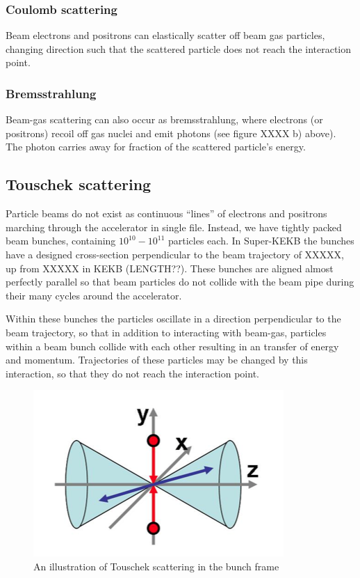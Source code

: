 \documentclass[12pt]{thesis}  %
\begin{document}
\subsubsection{Coulomb scattering}

Beam electrons and positrons can elastically scatter off beam gas particles, changing direction such that the scattered particle does not reach the interaction point.

\subsubsection{Bremsstrahlung}

Beam-gas scattering can also occur as bremsstrahlung, where electrons (or positrons) recoil off gas nuclei and emit photons (see figure XXXX b) above). The photon carries away for fraction of the scattered particle's energy.


\subsection{Touschek scattering}

Particle beams do not exist as continuous ``lines'' of electrons and positrons marching through the accelerator in single file. Instead, we have tightly packed beam bunches, containing $10^{10} - 10^{11}$ particles each. In Super-KEKB the bunches have a designed cross-section perpendicular to the beam trajectory of XXXXX, up from XXXXX in KEKB (LENGTH??). These bunches are aligned almost perfectly parallel so that beam particles do not collide with the beam pipe during their many cycles around the accelerator.

Within these bunches the particles oscillate in a direction perpendicular to the beam trajectory, so that in addition to interacting with beam-gas, particles within a beam bunch collide with each other resulting in an transfer of energy and momentum. Trajectories of these particles may be changed by this interaction, so that they do not reach the interaction point. 

\begin{figure}[h]
\centering
\includegraphics[width=0.5\linewidth]{images/touschek-beam-frame.png}
\caption{An illustration of Touschek scattering in the bunch frame}
\label{fig:test2}
\end{figure}
\end{document}
